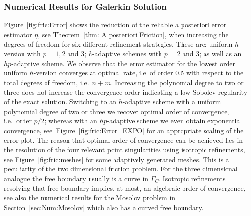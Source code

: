 \documentclass[12pt,twoside,reqno]{amsart}
\theoremstyle{definition}
\numberwithin{equation}{section}
\begin{document}
\subsubsection{Numerical Results for Galerkin Solution}
Figure~\ref{fig:fric:Error} shows the reduction of the reliable a posteriori error estimator $\eta$, see Theorem~\ref{thm: A posteriori Friction}, when increasing the degrees of freedom for six different refinement strategies. These are: uniform $h$-version with $p=1,2$ and $3$; $h$-adaptive schemes with $p=2$ and $3$; as well as an $hp$-adaptive scheme.
We observe that the error estimator for the lowest order uniform $h$-version converges at optimal rate, i.e~of order $0.5$ with respect to the total degrees of freedom, i.e.~$n+m$. Increasing the polynomial degree to two or three does not increase the convergence order indicating a low Sobolev regularity of the exact solution. Switching to an $h$-adaptive scheme with a uniform polynomial degree of two or three we recover optimal order of convergence, i.e.~order $p/2$; whereas with an $hp$-adaptive scheme we even obtain exponential convergence, see~Figure~\ref{fig:fric:Error_EXPO} for an appropriate scaling of the error plot. The reason that optimal order of convergence can be achieved lies in the resolution of the four relevant point singularities using isotropic refinements, see Figure~\ref{fig:fric:meshes} for some adaptively generated meshes. This is a peculiarity of the two dimensional friction problem. For the three dimensional analogue the free boundary usually is a curve in $\Gamma_C$. Isotropic refinements  resolving that free boundary implies,  at most, an algebraic order of convergence, see also the numerical results for the Mosolov problem in Section~\ref{sec:Num:Mosolov} which also has a curved free boundary.
\end{document}
